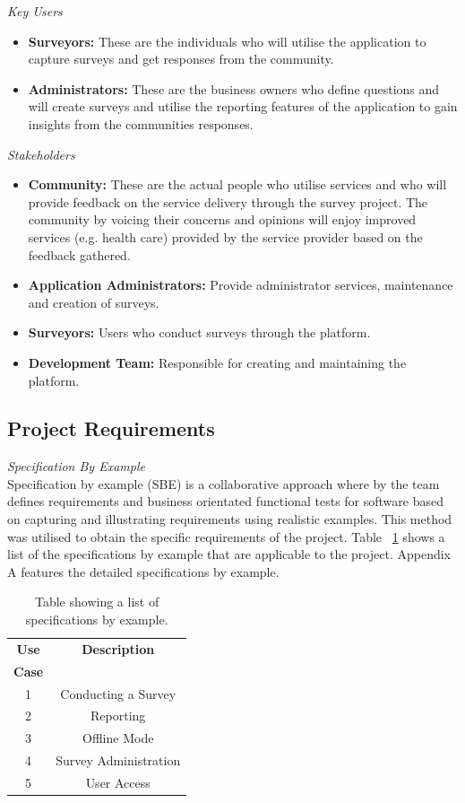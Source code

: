\documentclass[12pt]{witseiepaper}
\begin{document}
\emph{Key Users} 
\begin{itemize}
  \item \textbf{Surveyors:} These are the individuals who will utilise the application to capture surveys and get responses from the community.
  \item \textbf{Administrators:} These are the business owners who define questions and will create surveys and utilise the reporting features of the application to gain insights from the communities responses.
\end{itemize}

\emph{Stakeholders} 
\begin{itemize}
  \item \textbf{Community:} These are the actual people who utilise services and who will provide feedback on the service delivery through the survey project. The community by voicing their concerns and opinions will enjoy improved services (e.g. health care) provided by the service provider based on the feedback gathered.
  \item \textbf{Application Administrators:} Provide administrator services, maintenance and creation of surveys.
  \item \textbf{Surveyors:} Users who conduct surveys through the platform.
  \item \textbf{Development Team:} Responsible for creating and maintaining the platform. 
\end{itemize}


\subsection{Project Requirements}
\emph{Specification By Example}\\
Specification by example (SBE) is a collaborative approach where by the team defines requirements and business orientated functional tests for software based on capturing and illustrating requirements using realistic examples. This method was utilised to obtain the specific requirements of the project.
Table ~\ref{tbl:use} shows a list of the specifications by example that are applicable to the project. Appendix A features the detailed specifications by example.

\begin{table}[htb] \caption{Table showing a list of specifications by example.} \label{tbl:use} 
    \begin{center}
  \begin{tabular}
    {|c|c|} \hline \textbf{Use} &\textbf{Description}\\
    \textbf{Case} &\\
    \hline 1 &Conducting a Survey\\
    \hline 2 &Reporting\\
    \hline 3 &Offline Mode\\
    \hline 4 &Survey Administration\\
    \hline 5 &User Access\\
    \hline 
  \end{tabular}
      \end{center}
\end{table}
\end{document}
